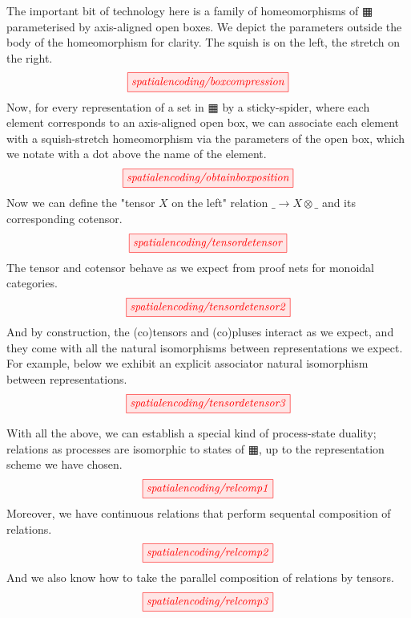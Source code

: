The important bit of technology here is a family of homeomorphisms of $\squarehvfill$ parameterised by axis-aligned open boxes. We depict the parameters outside the body of the homeomorphism for clarity. The squish is on the left, the stretch on the right.
\[\scalebox{1}{\tikzfig{spatialencoding/boxcompression}}\]
Now, for every representation of a set in $\squarehvfill$ by a sticky-spider, where each element corresponds to an axis-aligned open box, we can associate each element with a squish-stretch homeomorphism via the parameters of the open box, which we notate with a dot above the name of the element.
\[\scalebox{1}{\tikzfig{spatialencoding/obtainboxposition}}\]
Now we can define the "tensor $X$ on the left" relation $\_ \rightarrow X \otimes \_$ and its corresponding cotensor.
\[\scalebox{1}{\tikzfig{spatialencoding/tensordetensor}}\]
The tensor and cotensor behave as we expect from proof nets for monoidal categories.
\[\scalebox{1}{\tikzfig{spatialencoding/tensordetensor2}}\]
And by construction, the (co)tensors and (co)pluses interact as we expect, and they come with all the natural isomorphisms between representations we expect. For example, below we exhibit an explicit associator natural isomorphism between representations.
\[\scalebox{1}{\tikzfig{spatialencoding/tensordetensor3}}\]

\begin{construction}
With all the above, we can establish a special kind of process-state duality; relations as processes are isomorphic to states of $\squarehvfill$, up to the representation scheme we have chosen.
\[\scalebox{1}{\tikzfig{spatialencoding/relcomp1}}\]
Moreover, we have continuous relations that perform sequental composition of relations.
\[\scalebox{1}{\tikzfig{spatialencoding/relcomp2}}\]
And we also know how to take the parallel composition of relations by tensors.
\[\scalebox{1}{\tikzfig{spatialencoding/relcomp3}}\]
\end{construction}